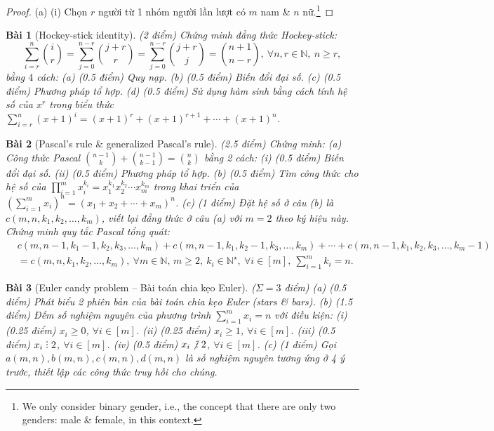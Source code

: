 \documentclass{article}
\newtheorem{baitoan}{Bài}
\DeclareRobustCommand{\divby}{%
    \mathrel{\vbox{\baselineskip.65ex\lineskiplimit0pt\hbox{.}\hbox{.}\hbox{.}}}%
}
\begin{document}
\begin{proof}
    (a) (i) Chọn $r$ người từ 1 nhóm người lần lượt có $m$ nam \& $n$ nữ.\footnote{We only consider binary gender, i.e., the concept that there are only two genders: male \& female, in this context.}
\end{proof}

\begin{baitoan}[Hockey-stick identity]
    {\rm(2 điểm)} Chứng minh đẳng thức Hockey-stick:
    \begin{equation*}
        \sum_{i=r}^n \binom{i}{r} = \sum_{j=0}^{n - r} \binom{j + r}{r} = \sum_{j=0}^{n - r} \binom{j + r}{j} = \binom{n + 1}{n - r},\ \forall n,r\in\mathbb{N},\ n\ge r,
    \end{equation*}
    bằng $4$ cách: (a) {\rm(0.5 điểm)} Quy nạp. (b) {\rm(0.5 điểm)} Biến đổi đại số. (c) {\rm(0.5 điểm)} Phương pháp tổ hợp. (d) {\rm(0.5 điểm)} Sử dụng hàm sinh bằng cách tính hệ số của $x^r$ trong biểu thức $\sum_{i=r}^n (x + 1)^i = (x + 1)^r + (x + 1)^{r + 1} + \cdots + (x + 1)^n$.
\end{baitoan}

\begin{baitoan}[Pascal's rule \& generalized Pascal's rule]
    {\rm(2.5 điểm)} Chứng minh: (a) Công thức Pascal $\binom{n - 1}{k} + \binom{n - 1}{k - 1} = \binom{n}{k}$ bằng 2 cách: (i) {\rm(0.5 điểm)} Biến đổi đại số. (ii) {\rm(0.5 điểm)} Phương pháp tổ hợp. (b) {\rm(0.5 điểm)} Tìm công thức cho hệ số của $\prod_{i=1}^m x_i^{k_i} = x_1^{k_1}x_2^{k_2}\cdots x_m^{k_m}$ trong khai triển của $\left(\sum_{i=1}^m x_i\right)^n = (x_1 + x_2 + \cdots + x_m)^n$. (c) {\rm(1 điểm)} Đặt hệ số ở câu (b) là $c(m,n,k_1,k_2,\ldots,k_m)$, viết lại đẳng thức ở câu (a) với $m = 2$ theo ký hiệu này. Chứng minh quy tắc Pascal tổng quát:
    \begin{align*}
        &c(m,n - 1,k_1 - 1,k_2,k_3,\ldots,k_m) + c(m,n - 1,k_1,k_2 - 1,k_3,\ldots,k_m) + \cdots + c(m,n - 1,k_1,k_2,k_3,\ldots,k_m - 1)\\
        &= c(m,n,k_1,k_2,\ldots,k_m),\ \forall m\in\mathbb{N},\,m\ge2,\ k_i\in\mathbb{N}^\star,\ \forall i\in[m],\ \sum_{i=1}^m k_i = n.
    \end{align*}
\end{baitoan}

\begin{baitoan}[Euler candy problem -- Bài  toán chia kẹo Euler]
    {\rm($\Sigma = 3$ điểm)} (a) {\rm(0.5 điểm)} Phát biểu 2 phiên bản của bài toán chia kẹo Euler (stars \& bars). (b) {\rm(1.5 điểm)} Đếm số nghiệm nguyên của phương trình $\sum_{i=1}^m x_i = n$ với điều kiện: (i) {\rm(0.25 điểm)} $x_i\ge0$, $\forall i\in[m]$. (ii) {\rm(0.25 điểm)} $x_i\ge1$, $\forall i\in[m]$. (iii) {\rm(0.5 điểm)} $x_i\divby2$, $\forall i\in[m]$. (iv) {\rm(0.5 điểm)} $x_i\not{\divby2}$, $\forall i\in[m]$. (c) {\rm(1 điểm)} Gọi $a(m,n),b(m,n),c(m,n),d(m,n)$ là số nghiệm nguyên tương ứng ở 4 ý trước, thiết lập các công thức truy hồi cho chúng.
\end{baitoan}
\end{document}

